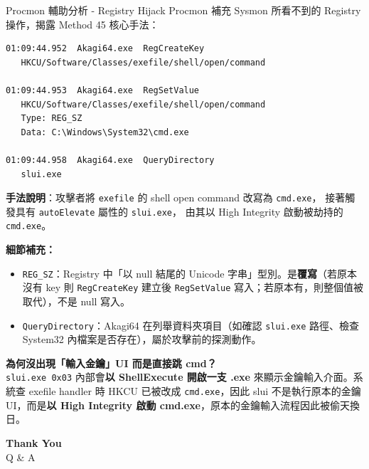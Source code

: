 \documentclass[12pt,aspectratio=169]{beamer}
\begin{document}
\begin{frame}[fragile]{Procmon 輔助分析 - Registry Hijack}
Procmon 補充 Sysmon 所看不到的 Registry 操作，揭露 Method 45 核心手法：
\begin{lstlisting}[style=dark,basicstyle=\scriptsize\ttfamily\color{codefg}]
01:09:44.952  Akagi64.exe  RegCreateKey
   HKCU/Software/Classes/exefile/shell/open/command

01:09:44.953  Akagi64.exe  RegSetValue
   HKCU/Software/Classes/exefile/shell/open/command
   Type: REG_SZ
   Data: C:\Windows\System32\cmd.exe

01:09:44.958  Akagi64.exe  QueryDirectory
   slui.exe
\end{lstlisting}

\textbf{手法說明}：攻擊者將 \texttt{exefile} 的 shell open command 改寫為 \texttt{cmd.exe}，
接著觸發具有 \texttt{autoElevate} 屬性的 \texttt{slui.exe}，
由其以 High Integrity 啟動被劫持的 \texttt{cmd.exe}。

\vspace{0.3em}
\textbf{細節補充：}
\begin{itemize}
  \footnotesize
  \item \texttt{REG\_SZ}：Registry 中「以 null 結尾的 Unicode 字串」型別。是\textbf{覆寫}（若原本沒有 key 則 \texttt{RegCreateKey} 建立後 \texttt{RegSetValue} 寫入；若原本有，則整個值被取代），不是 null 寫入。
  \item \texttt{QueryDirectory}：Akagi64 在列舉資料夾項目（如確認 \texttt{slui.exe} 路徑、檢查 System32 內檔案是否存在），屬於攻擊前的探測動作。
\end{itemize}

\vspace{0.2em}
\textbf{為何沒出現「輸入金鑰」UI 而是直接跳 cmd？}\\
\footnotesize
\texttt{slui.exe 0x03} 內部會\textbf{以 ShellExecute 開啟一支 .exe} 來顯示金鑰輸入介面。系統查 exefile handler 時 HKCU 已被改成 \texttt{cmd.exe}，因此 slui 不是執行原本的金鑰 UI，而是\textbf{以 High Integrity 啟動 cmd.exe}，原本的金鑰輸入流程因此被偷天換日。
\end{frame}


\begin{frame}
\centering
\vfill
{\Huge\bfseries Thank You}\\[1em]
{\Large Q \& A}
\vfill
\end{frame}
\end{document}
